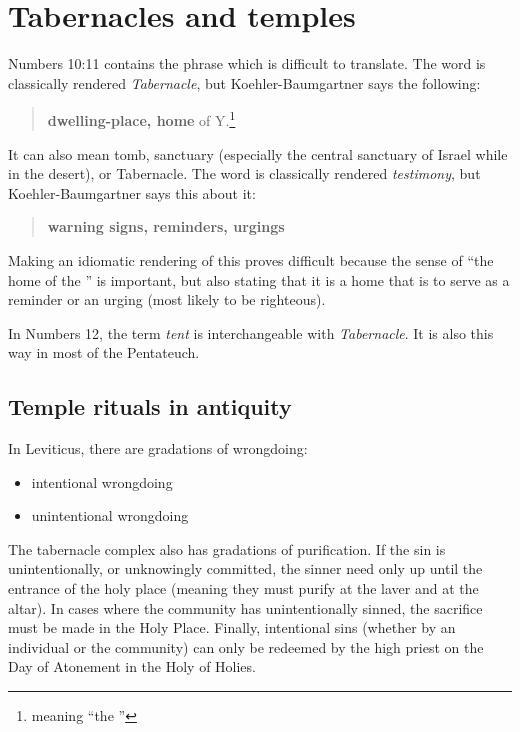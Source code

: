 \section{Tabernacles and temples}\label{app:tabernacle}
Numbers 10:11 contains the phrase  which is difficult to translate. The word  is classically rendered \textit{Tabernacle}, but Koehler-Baumgartner says the following:
\begin{quote}
  \textbf{dwelling-place, home} of Y.\footnote{meaning ``the \lord''}
\end{quote}
It can also mean tomb, sanctuary (especially the central sanctuary of Israel while in the desert), or Tabernacle. The word  is classically rendered \textit{testimony}, but Koehler-Baumgartner says this about it:
\begin{quote}
  \textbf{warning signs, reminders, urgings}
\end{quote}
Making an idiomatic rendering of this proves difficult because the sense of ``the home of the \lord'' is important, but also stating that it is a home that is to serve as a reminder or an urging (most likely to be righteous).

In Numbers 12, the term \textit{tent} is interchangeable with \textit{Tabernacle}. It is also this way in most of the Pentateuch.

\subsection{Temple rituals in antiquity}\label{app:sins-transgressions}
In Leviticus, there are gradations of wrongdoing:
\begin{itemize}
  \item {} intentional wrongdoing
  \item {} unintentional wrongdoing
\end{itemize}

The tabernacle complex also has gradations of purification. If the sin is unintentionally, or unknowingly committed, the sinner need only up until the entrance of the holy place (meaning they must purify at the laver and at the altar). In cases where the community has unintentionally sinned, the sacrifice must be made in the Holy Place. Finally, intentional sins (whether by an individual or the community) can only be redeemed by the high priest on the Day of Atonement in the Holy of Holies.
